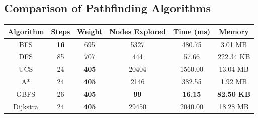 \subsection{Comparison of Pathfinding Algorithms}

\begin{table}[h]
    \centering
    \begin{tabular}{|c|c|c|c|c|c|}
        \hline
        \textbf{Algorithm} & \textbf{Steps} & \textbf{Weight} & \textbf{Nodes Explored} & \textbf{Time (ms)} & \textbf{Memory} \\
        \hline
        BFS & \textbf{16} & 695 & 5327 & 480.75 & 3.01 MB \\
        \hline
        DFS & 85 & 707 & 444 & 57.66 & 222.34 KB \\
        \hline
        UCS & 24 & \textbf{405} & 20404 & 1560.00 & 13.04 MB \\
        \hline
        A* & 24 & \textbf{405} & 2146 & 382.55 & 1.92 MB \\
        \hline
        GBFS & 26 & \textbf{405} & \textbf{99} & \textbf{16.15} & \textbf{82.50 KB} \\
        \hline
        Dijkstra & 24 & \textbf{405} & 29450 & 2040.00 & 18.28 MB \\
        \hline
    \end{tabular}
    \label{tab:sokoban_comparison}
\end{table}

